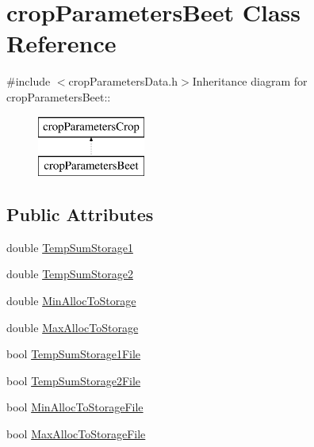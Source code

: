 \hypertarget{classcrop_parameters_beet}{
\section{cropParametersBeet Class Reference}
\label{classcrop_parameters_beet}
}


{\ttfamily \#include $<$cropParametersData.h$>$}Inheritance diagram for cropParametersBeet::\begin{figure}[H]
\begin{center}
\leavevmode
\includegraphics[height=2cm]{classcrop_parameters_beet}
\end{center}
\end{figure}
\subsection*{Public Attributes}
\begin{DoxyCompactItemize}
\item 
double \hyperlink{classcrop_parameters_beet_a5c3de50f024316c4f4dc7147d1fe0580}{TempSumStorage1}
\item 
double \hyperlink{classcrop_parameters_beet_a342acb344ba25158de816f8ac75d312b}{TempSumStorage2}
\item 
double \hyperlink{classcrop_parameters_beet_a07432d525f17cb810ea026bb4e9a70ba}{MinAllocToStorage}
\item 
double \hyperlink{classcrop_parameters_beet_aeaa3c263dc1eedcee50f83d43542bf4e}{MaxAllocToStorage}
\item 
bool \hyperlink{classcrop_parameters_beet_a2dc5bebb7c4457b96ae65ddd53d72568}{TempSumStorage1File}
\item 
bool \hyperlink{classcrop_parameters_beet_aea67fec8f633b227a0eb7b9386307b2e}{TempSumStorage2File}
\item 
bool \hyperlink{classcrop_parameters_beet_a7bd7e25109730770dbe00f6e6211ff73}{MinAllocToStorageFile}
\item 
bool \hyperlink{classcrop_parameters_beet_ad34877137f18d7adbed188f4f32acfef}{MaxAllocToStorageFile}
\end{DoxyCompactItemize}


